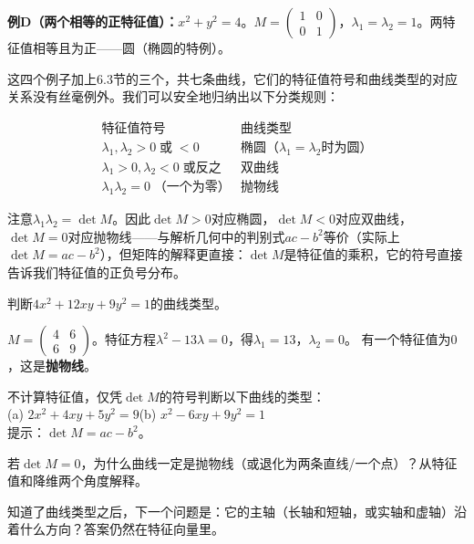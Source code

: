 \vspace{0.2cm}
\noindent\textbf{例D（两个相等的正特征值）：}$x^2+y^2=4$。$M=\begin{pmatrix}1&0\\0&1\end{pmatrix}$，$\lambda_1=\lambda_2=1$。两特征值相等且为正——圆（椭圆的特例）。

这四个例子加上6.3节的三个，共七条曲线，它们的特征值符号和曲线类型的对应关系没有丝毫例外。我们可以安全地归纳出以下分类规则：

\[
\begin{array}{c|c}
\textbf{特征值符号} & \textbf{曲线类型}\\\hline
\lambda_1,\lambda_2>0\;\text{或}\;<0 & \text{椭圆（$\lambda_1=\lambda_2$时为圆）}\\
\lambda_1>0,\lambda_2<0\;\text{或反之} & \text{双曲线}\\
\lambda_1\lambda_2=0\;\text{（一个为零）} & \text{抛物线}
\end{array}
\]

注意$\lambda_1\lambda_2=\det M$。因此$\det M>0$对应椭圆，$\det M<0$对应双曲线，$\det M=0$对应抛物线——与解析几何中的判别式$ac-b^2$等价（实际上$\det M = ac-b^2$），但矩阵的解释更直接：$\det M$是特征值的乘积，它的符号直接告诉我们特征值的正负号分布。

\begin{example}
判断$4x^2+12xy+9y^2=1$的曲线类型。
\end{example}
\begin{solution}
$M=\begin{pmatrix}4&6\\6&9\end{pmatrix}$。特征方程$\lambda^2-13\lambda=0$，得$\lambda_1=13$，$\lambda_2=0$。
有一个特征值为$0$，这是\textbf{抛物线}。
\end{solution}

\begin{exercise}
\item 不计算特征值，仅凭$\det M$的符号判断以下曲线的类型：\\
(a) $2x^2+4xy+5y^2=9$\quad (b) $x^2-6xy+9y^2=1$\\
提示：$\det M = ac-b^2$。
\item 若$\det M=0$，为什么曲线一定是抛物线（或退化为两条直线/一个点）？从特征值和降维两个角度解释。
\end{exercise}


知道了曲线类型之后，下一个问题是：它的主轴（长轴和短轴，或实轴和虚轴）沿着什么方向？答案仍然在特征向量里。

